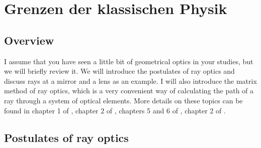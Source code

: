 \renewcommand{\lastmod}{10. September 2024}
\renewcommand{\chapterauthors}{Markus Lippitz}

\chapter{Grenzen der klassischen Physik}






\section{Overview}

I assume that you have seen a little bit of geometrical optics in your studies, but we will briefly review it. We will introduce the postulates of ray optics and discuss rays at a mirror and a lens as an example. I will also introduce the matrix method of ray optics, which is a very convenient way of calculating the path of a ray through a system of optical elements. More details on these topics can be found in chapter 1 of \cite{SalehTeich1991}, chapter 2 of \cite{Hering_Martin_Optik},  chapters 5 and 6 of \cite{Hecht_Optics}, chapter 2 of \cite{Konijnenberg_Optics}.


\section{Postulates of ray optics}


\printbibliography[segment=\therefsegment,heading=subbibliography]
